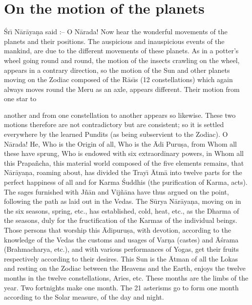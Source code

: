 \chapter{On the motion of the planets}

\'Sr\={\i} N\=ar\=aya\d{n}a said :-- O N\=arada! Now hear the wonderful movements of the planets and their positions. The auspicious and inauspicious events of the mankind, are due to the different movements of these planets. As in a potter's wheel going round and round, the motion of the insects crawling on the wheel, appears in a contrary direction, so the motion of the Sun and other planets moving on the Zodiac composed of the R\=as\={\i}s (12 constellations) which again always moves round the Meru as an axle, appears different. Their motion from one star to

another and from one constellation to another appears so likewise. These two motions therefore are not contradictory but are consistent; so it is settled everywhere by the learned Pundits (as being subservient to the Zodiac). O N\=arada! He, Who is the Origin of all, Who is the \=Adi Puru\d{s}a, from Whom all these have sprung, Who is endowed with six extraordinary powers, in Whom all this Prapa\~ncha, this material world composed of the five elements remains, that N\=ar\=aya\d{n}a, roaming about, has divided the Tray\={\i} \=Atm\=a into twelve parts for the perfect happiness of all and for Karma \'Suddhis (the purification of Karma, acts). The sages furnished with J\~n\=an and Vij\~n\=ana have thus argued on the point, following the path as laid out in the Vedas. The S\=urya N\=ar\=aya\d{n}a, moving on in the six seasons, spring, etc., has established, cold, heat, etc., as the Dharma of the seasons, duly for the fructification of the Karmas of the individual beings. Those persons that worship this \=Adipuru\d{s}a, with devotion, according to the knowledge of the Vedas the customs and usages of Var\d{n}a (castes) and \=A\'srama (Brahmacharya, etc.), and with various performances of Yogas, get their fruits respectively according to their desires. This Sun is the \=Atman of all the Lokas and resting on the Zodiac between the Heavens and the Earth, enjoys the twelve months in the twelve constellations, Aries, etc. These months are the limbs of the year. Two fortnights make one month. The 21 asterisms go to form one month according to the Solar measure, of the day and night.

